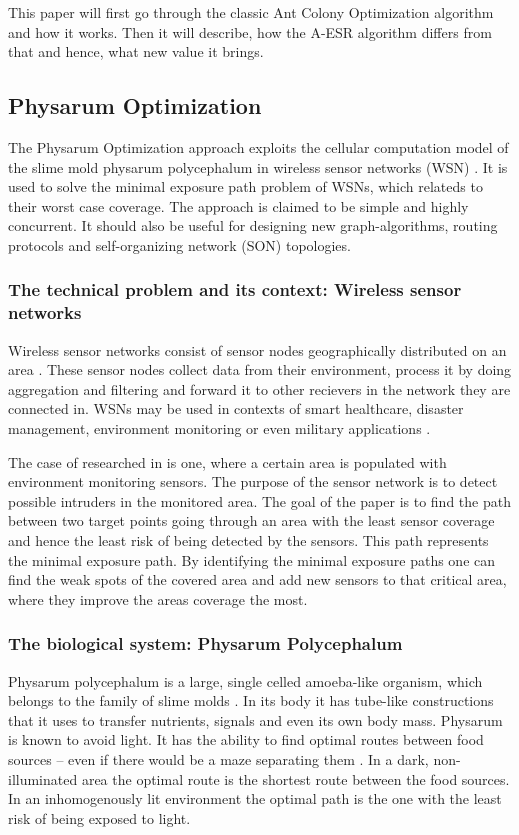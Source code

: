 \documentclass{IWORK2014}
\begin{document}
This paper will first go through the classic Ant Colony Optimization algorithm and how it works. Then it will describe, how the A-ESR algorithm differs from that and hence, what new value it brings. 



\subsection{Physarum Optimization}
The Physarum Optimization approach exploits the cellular computation model of the slime mold physarum polycephalum in wireless sensor networks (WSN) \cite{liu2012physarum}. It is used to solve the minimal exposure path problem of WSNs, which relateds to their worst case coverage. The approach is claimed to be simple and highly concurrent. It should also be useful for designing new graph-algorithms, routing protocols and self-organizing network (SON) topologies.

\subsubsection{The technical problem and its context: Wireless sensor networks}
Wireless sensor networks consist of sensor nodes geographically distributed on an area \cite{nazi2013robust}. These sensor nodes collect data from their environment, process it by doing aggregation and filtering and forward it to other recievers in the network they are connected in. WSNs may be used in contexts of smart healthcare, disaster management, environment monitoring \cite{nazi2013robust} or even military applications \cite{liu2012physarum}.

The case of researched in \cite{liu2012physarum} is one, where a certain area is populated with environment monitoring sensors. The purpose of the sensor network is to detect possible intruders in the monitored area. The goal of the paper is to find the path between two target points going through an area with the least sensor coverage and hence the least risk of being detected by the sensors. This path represents the minimal exposure path. By identifying the minimal exposure paths one can find the weak spots of the covered area and add new sensors to that critical area, where they improve the areas coverage the most.

\subsubsection{The biological system: Physarum Polycephalum}
Physarum polycephalum is a large, single celled amoeba-like organism, which belongs to the family of slime molds \cite{liu2012physarum}. In its body it has tube-like constructions that it uses to transfer nutrients, signals and even its own body mass. Physarum is known to avoid light. It has the ability to find optimal routes between food sources -- even if there would be a maze separating them \cite{nakagaki2000intelligence}. In a dark, non-illuminated area the optimal route is the shortest route between the food sources. In an inhomogenously lit environment the optimal path is the one with the least risk of being exposed to light.
\end{document}
